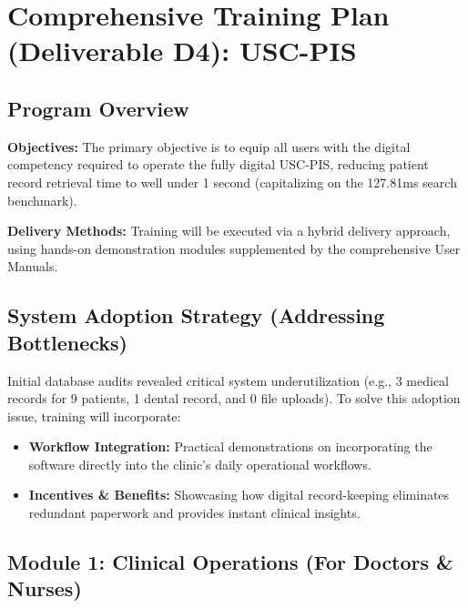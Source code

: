 
\chapter{Comprehensive Training Plan (Deliverable D4): USC-PIS}
\label{appendix:training_plan}

\section{Program Overview}

\textbf{Objectives:} The primary objective is to equip all users with the digital competency required to operate the fully digital USC-PIS, reducing patient record retrieval time to well under 1 second (capitalizing on the 127.81ms search benchmark).

\textbf{Delivery Methods:} Training will be executed via a hybrid delivery approach, using hands-on demonstration modules supplemented by the comprehensive User Manuals.

\section{System Adoption Strategy (Addressing Bottlenecks)}

Initial database audits revealed critical system underutilization (e.g., 3 medical records for 9 patients, 1 dental record, and 0 file uploads). To solve this adoption issue, training will incorporate:
\begin{itemize}
    \item \textbf{Workflow Integration:} Practical demonstrations on incorporating the software directly into the clinic's daily operational workflows.
    \item \textbf{Incentives \& Benefits:} Showcasing how digital record-keeping eliminates redundant paperwork and provides instant clinical insights.
\end{itemize}

\section{Module 1: Clinical Operations (For Doctors \& Nurses)}

